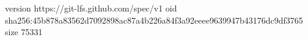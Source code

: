 version https://git-lfs.github.com/spec/v1
oid sha256:45b878a83562d7092898ac87a4b226a84f3a92eeee9639947b43176dc9df3765
size 75331

